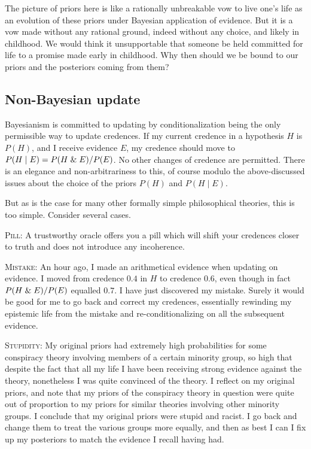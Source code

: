 The picture of priors here is like a rationally unbreakable vow to live one's life as an evolution
of these priors under Bayesian application of evidence. But it is a vow made without any rational 
ground, indeed without any choice, and likely in childhood. We would think it unsupportable that
someone be held committed for life to a promise made early in childhood. Why then should we be bound to
our priors and the posteriors coming from them?


\subsection{Non-Bayesian update}
Bayesianism is committed to updating by conditionalization being the only permissible way to update credences. 
If my current credence in a hypothesis $H$ is $P(H)$, and I receive evidence $E$, my credence should move 
to $P(H\mid E)=P(H\mathrel{\&} E)/P(E)$. No other changes of credence are permitted. There is an elegance and non-arbitrariness to this,
of course modulo the above-discussed issues about the choice of the priors $P(H)$ and $P(H\mid E)$.

But as is the case for many other formally simple philosophical theories, this is too
simple. Consider several cases. 

\textsc{Pill:} A trustworthy oracle offers you a pill which will shift your credences closer to truth and does not introduce 
any incoherence. 

\textsc{Mistake:} An hour ago, I made an arithmetical evidence when updating on evidence. I moved from credence $0.4$ in $H$ to
credence $0.6$, even though in fact $P(H\mathrel{\&} E)/P(E)$ equalled $0.7$. I have just discovered my mistake. Surely it would be good
for me to go back and correct my credences, essentially rewinding my epistemic life from the mistake and re-conditionalizing on all
the subsequent evidence. 

\textsc{Stupidity:} My original priors had extremely high probabilities for some conspiracy theory involving members of a certain 
minority group, so high that despite the fact that all my life I have been receiving strong evidence against the theory, nonetheless I 
was quite convinced of the theory. I reflect on my original priors, and note that my priors of the conspiracy theory in question were 
quite out of proportion to my priors for similar theories involving other minority groups. I conclude that my original priors were
stupid and racist. I go back and change them to treat the various groups more equally, and then as best I can I fix up my posteriors
to match the evidence I recall having had. 

